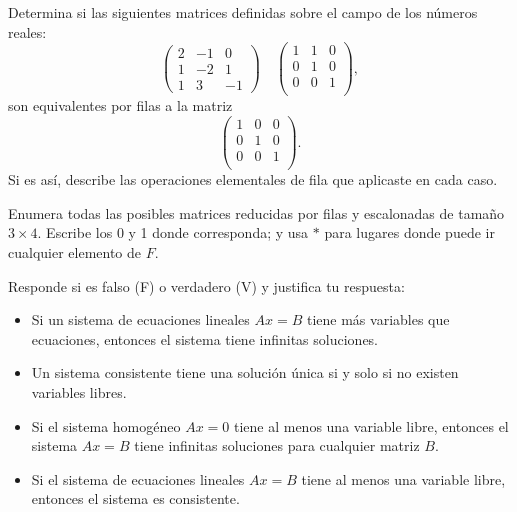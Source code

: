 \documentclass[12pt,a4paper]{book}
\begin{document}
    \begin{ejercicio}
        Determina si las siguientes matrices definidas sobre el campo de los números reales:
        \[
        \begin{pmatrix}
            2 & -1 & 0 \\
            1 & -2 & 1 \\
            1 & 3 & -1
        \end{pmatrix}
        \quad
        \begin{pmatrix}
            1 & 1 & 0 \\
            0 & 1 & 0 \\
            0 & 0 & 1 \\
        \end{pmatrix},
        \]
        son equivalentes por filas a la matriz
        \[
        \begin{pmatrix}
        1 & 0 & 0 \\
        0 & 1 & 0 \\
        0 & 0 & 1 \\
        \end{pmatrix}.
        \]
        Si es así, describe las operaciones elementales de fila que aplicaste en cada caso.
    \end{ejercicio}

    \begin{ejercicio}
        Enumera todas las posibles matrices reducidas por filas y escalonadas de tamaño $3 \times 4$. Escribe los 0 y 1 donde corresponda; y usa $\ast$ para lugares donde puede ir cualquier elemento de $F$.
    \end{ejercicio}

    \begin{ejercicio}
        Responde si es falso (F) o verdadero (V) y justifica tu respuesta:
        \begin{itemize}
            \item[(a)] Si un sistema de ecuaciones lineales $Ax = B$ tiene más variables que ecuaciones, entonces el sistema tiene infinitas soluciones.
            \item[(b)] Un sistema consistente tiene una solución única si y solo si no existen variables libres.
            \item[(c)] Si el sistema homogéneo $Ax = 0$ tiene al menos una variable libre, entonces el sistema $Ax = B$ tiene infinitas soluciones para cualquier matriz $B$.
            \item[(d)] Si el sistema de ecuaciones lineales $Ax = B$ tiene al menos una variable libre, entonces el sistema es consistente.
        \end{itemize}
    \end{ejercicio}
\end{document}
